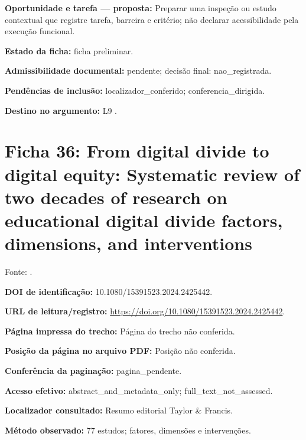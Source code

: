 \noindent\textbf{Oportunidade e tarefa — proposta:} Preparar uma inspeção ou estudo contextual que registre tarefa, barreira e critério; não declarar acessibilidade pela execução funcional.\par\medskip

\noindent\textbf{Estado da ficha:} ficha preliminar.\par\medskip

\noindent\textbf{Admissibilidade documental:} pendente; decisão final: nao\_registrada.\par\medskip

\noindent\textbf{Pendências de inclusão:} localizador\_conferido; conferencia\_dirigida.\par\medskip

\noindent\textbf{Destino no argumento:} L9 .

\clearpage\section*{Ficha 36: From digital divide to digital equity: Systematic review of two decades of research on educational digital divide factors, dimensions, and interventions}

Fonte: \citet{martin2024}.

\noindent\textbf{DOI de identificação:} 10.1080/15391523.2024.2425442.\par\medskip

\noindent\textbf{URL de leitura/registro:} \url{https://doi.org/10.1080/15391523.2024.2425442}.\par\medskip

\noindent\textbf{Página impressa do trecho:} Página do trecho não conferida.\par\medskip

\noindent\textbf{Posição da página no arquivo PDF:} Posição não conferida.\par\medskip

\noindent\textbf{Conferência da paginação:} pagina\_pendente.\par\medskip

\noindent\textbf{Acesso efetivo:} abstract\_and\_metadata\_only; full\_text\_not\_assessed.\par\medskip

\noindent\textbf{Localizador consultado:} Resumo editorial Taylor \& Francis.\par\medskip

\noindent\textbf{Método observado:} 77 estudos; fatores, dimensões e intervenções.\par\medskip

